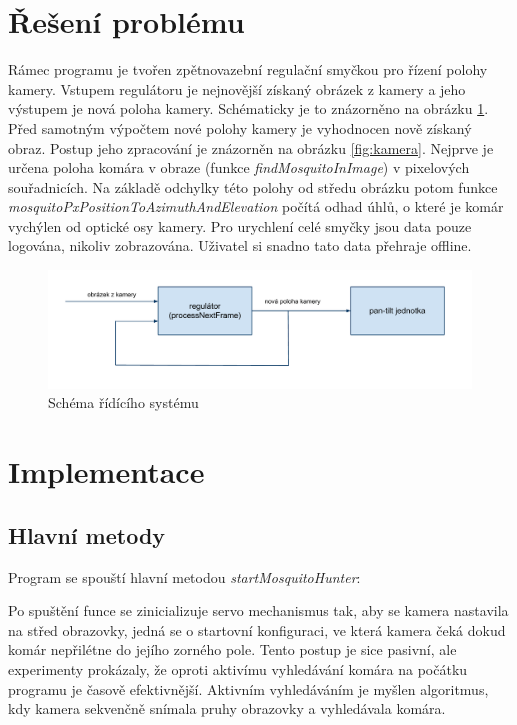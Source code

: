 \documentclass[a4paper,10pt]{article}
\begin{document}
\section{Řešení problému}

Rámec programu je tvořen zpětnovazební regulační smyčkou pro řízení polohy kamery. Vstupem regulátoru je nejnovější získaný obrázek z kamery a jeho výstupem je nová poloha kamery. Schématicky je to znázorněno na obrázku \ref{fig:rid_system}.
Před samotným výpočtem nové polohy kamery je vyhodnocen nově získaný obraz. Postup jeho zpracování je znázorněn na obrázku \ref{fig:kamera}.
Nejprve je určena poloha komára v obraze (funkce \textit{findMosquitoInImage}) v pixelových souřadnicích. Na základě odchylky této polohy od středu obrázku potom funkce \textit{mosquitoPxPositionToAzimuthAndElevation} počítá odhad úhlů, o které je komár vychýlen od optické osy kamery. Pro urychlení celé smyčky jsou data pouze logována, nikoliv zobrazována. Uživatel si snadno tato data přehraje offline.

\begin{figure}[!h]
    \centering
     \includegraphics[width=1\columnwidth]{pics/schema_ridiciho_systemu}
     \caption{Schéma řídícího systému\label{fig:rid_system}}
\end{figure}


\section{Implementace}

\subsection{Hlavní metody}

Program se spouští hlavní metodou \textit{startMosquitoHunter}:

Po spuštění funce se zinicializuje servo mechanismus tak, aby se kamera nastavila na střed obrazovky, jedná se o startovní konfiguraci, ve která kamera čeká dokud komár nepřilétne do jejího zorného pole. Tento postup je sice pasivní, ale experimenty prokázaly, že oproti aktivímu vyhledávání komára na počátku programu je časově efektivnější. Aktivním vyhledáváním je myšlen algoritmus, kdy kamera sekvenčně snímala pruhy obrazovky a vyhledávala komára.
\end{document}
